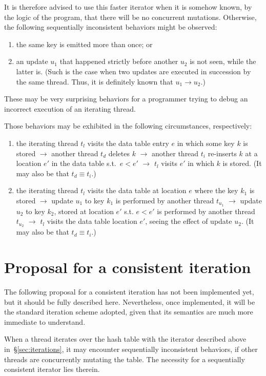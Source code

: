 It is therefore advised to use this faster iterator when it is somehow known, by the logic of the program, that there will be no concurrent mutations.
Otherwise, the following sequentially inconsistent behaviors might be observed:
\begin{enumerate}
	\item the same key is emitted more than once; or
	\item an update $u_1$ that happened strictly before another $u_2$ is not seen, while the latter is.
	(Such is the case when two updates are executed in succession by the same thread.
	Thus, it is definitely known that $u_1 \rightarrow u_2$.)
\end{enumerate}

These may be very surprising behaviors for a programmer trying to debug an incorrect execution of an iterating thread.

Those behaviors may be exhibited in the following circumstances, respectively:
\begin{enumerate}
	\item the iterating thread $t_l$ visits the data table entry $e$ in which some key $k$ is stored $\rightarrow$ another thread $t_d$ deletes $k$ $\rightarrow$ another thread $t_i$ re-inserts $k$ at a location $e'$ in the data table s.t.\ $e < e'$ $\rightarrow$ $t_l$ visits $e'$ in which $k$ is stored.
	(It may also be that $t_d \equiv t_i$.)
	\item the iterating thread $t_l$ visits the data table at location $e$ where the key $k_1$ is stored $\rightarrow$ update $u_1$ to key $k_1$ is performed by another thread $t_{u_1}$ $\rightarrow$ update $u_2$ to key $k_2$, stored at location $e'$ s.t. $e < e'$ is performed by another thread $t_{u_2}$ $\rightarrow$ $t_l$ visits the data table location $e'$, seeing the effect of update $u_2$.
	(It may also be that $t_d \equiv t_i$.)
\end{enumerate}


\section{Proposal for a consistent iteration}\label{sec:consistent-iteration}

The following proposal for a consistent iteration has not been implemented yet, but it should be fully described here.
Nevertheless, once implemented, it will be the standard iteration scheme adopted, given that its semantics are much more immediate to understand.

When a thread iterates over the hash table with the iterator described above in~\S\ref{sec:iterations}, it may encounter sequentially inconsistent behaviors, if other threads are concurrently mutating the table.
The necessity for a sequentially consistent iterator lies therein.

